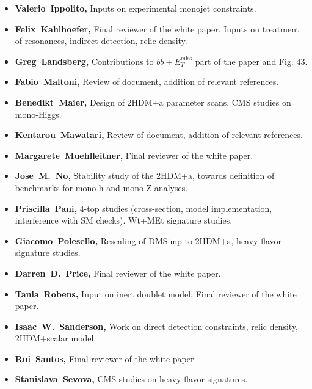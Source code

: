 \documentclass[a4paper, 11pt,notoc]{article}
\newcommand{\MET}{\ensuremath{E_T^\mathrm{miss}}\xspace}
\newcommand{\hdma}{\ensuremath{\textrm{2HDM+a}}\xspace}
\begin{document}
\begin{itemize}
\item \textbf{Valerio~Ippolito,} Inputs on experimental monojet constraints. 

\item \textbf{Felix~Kahlhoefer,} Final reviewer of the white paper. Inputs on treatment of resonances, indirect detection, relic density. 

\item \textbf{Greg~Landsberg,} Contributions to $bb+\MET$ part of the paper and Fig. 43.

\item \textbf{Fabio~Maltoni,} Review of document, addition of relevant references.

\item \textbf{Benedikt~Maier,} Design of \hdma parameter scans, CMS studies on mono-Higgs.

\item \textbf{Kentarou~Mawatari,} Review of document, addition of relevant references.

\item \textbf{Margarete~Muehlleitner,} Final reviewer of the white paper. 

\item \textbf{Jose~M.~No,} Stability study of the 2HDM+a, towards definition of benchmarks for mono-h and mono-Z analyses.

\item \textbf{Priscilla~Pani,} 4-top studies (cross-section, model implementation, interference with SM checks). Wt+MEt signature studies. 

\item \textbf{Giacomo~Polesello,} Rescaling of DMSimp to \hdma, heavy flavor signature studies. 

\item \textbf{Darren~D.~Price,}  Final reviewer of the white paper. 

\item \textbf{Tania~Robens,} Input on inert doublet model. Final reviewer of the white paper. 

\item \textbf{Isaac~W.~Sanderson,}  Work on direct detection constraints, relic density, 2HDM+scalar model.

\item \textbf{Rui~Santos,}  Final reviewer of the white paper. 

\item \textbf{Stanislava~Sevova,} CMS studies on heavy flavor signatures. 


\end{itemize}
\end{document}
